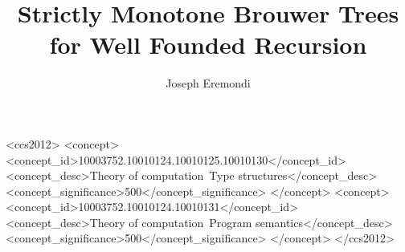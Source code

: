 \documentclass[dvipsnames,sigplan,10pt,anonymous,review]{acmart}\settopmatter{printfolios=true,printccs=false,printacmref=false}
\begin{document}
\title{Strictly Monotone Brouwer Trees for Well Founded Recursion}


  \author{Joseph Eremondi}





\renewcommand{\shortauthors}{Joseph Eremondi, Ronald Garcia, and \'Eric Tanter}




\begin{abstract}
  
\end{abstract}

\begin{CCSXML}
<ccs2012>
<concept>
<concept_id>10003752.10010124.10010125.10010130</concept_id>
<concept_desc>Theory of computation~Type structures</concept_desc>
<concept_significance>500</concept_significance>
</concept>
<concept>
<concept_id>10003752.10010124.10010131</concept_id>
<concept_desc>Theory of computation~Program semantics</concept_desc>
<concept_significance>500</concept_significance>
</concept>
</ccs2012>
\end{CCSXML}
\end{document}
